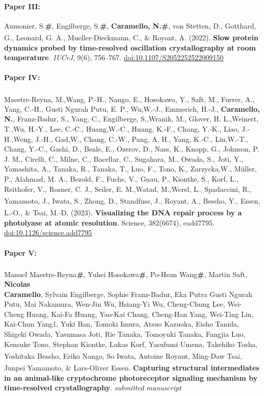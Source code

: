 \documentclass{report}
\begin{document}
\paragraph{Paper III:} Aumonier, S.\textbf{\#}, Engilberge, S.\textbf{\#},\textbf{ Caramello, N.}\textbf{\#}, von Stetten, D., Gotthard, G., Leonard, G. A., Mueller-Dieckmann, C., \& Royant, A.\textsuperscript{\textbf{\textalpha}} (2022). \textbf{Slow protein dynamics probed by time-resolved oscillation crystallography at room temperature}. \textit{IUCrJ}, 9(6), 756–767. \url{doi:10.1107/S2052252522009150}

\paragraph{Paper IV:} Maestre-Reyna\textsuperscript{\textbf{\textalpha}}, M.,Wang, P.-H., Nango, E., Hosokawa, Y., Saft, M., Furrer, A., Yang, C.-H., Gusti Ngurah Putu, E. P., Wu,W.-J., Emmerich, H.-J., \textbf{Caramello, N.}, Franz-Badur, S., Yang, C., Engilberge, S.,Wranik, M., Glover, H. L.,Weinert, T.,Wu, H.-Y., Lee, C.-C., Huang,W.-C., Huang, K.-F., Chang, Y.-K., Liao, J.-H.,Weng, J.-H., Gad,W., Chang, C.-W., Pang, A. H., Yang, K.-C., Lin,W.-T., Chang, Y.-C., Gashi, D., Beale, E., Ozerov, D., Nass, K., Knopp, G., Johnson, P. J. M., Cirelli, C., Milne, C., Bacellar, C., Sugahara, M., Owada, S., Joti, Y., Yamashita, A., Tanaka, R., Tanaka, T., Luo, F., Tono, K., Zarzycka,W., Müller, P., Alahmad, M. A., Bezold, F., Fuchs, V., Gnau, P., Kiontke, S., Korf, L., Reithofer, V., Rosner, C. J., Seiler, E. M.,Watad, M.,Werel, L., Spadaccini, R., Yamamoto, J., Iwata, S., Zhong, D., Standfuss, J., Royant, A., Bessho\textsuperscript{\textbf{\textalpha}}, Y., Essen, L.-O.\textsuperscript{\textbf{\textalpha}}, \& Tsai, M.-D.\textsuperscript{\textbf{\textalpha}} (2023). \textbf{Visualizing the DNA repair process by a photolyase at atomic resolution}. Science, 382(6674), eadd7795. \url{doi:10.1126/science.add7795}

\paragraph{Paper V:} Manuel Maestre-Reyna\textbf{\#}\textsuperscript{\textbf{\textalpha}}, Yuhei Hosokawa\textbf{\#}, Po-Hsun Wang\textbf{\#}, Martin Saft, \textbf{Nicolas\\ Caramello}, Sylvain Engilberge, Sophie Franz-Badur, Eka Putra Gusti Ngurah Putu, Mai Nakamura, Wen-Jin Wu, Hsiang-Yi Wu, Cheng-Chung Lee, Wei-Cheng Huang, Kai-Fa Huang, Yao-Kai Chang, Cheng-Han Yang, Wei-Ting Lin, Kai-Chun Yang1, Yuki Ban, Tomoki Imura, Atsuo Kazuoka, Eisho Tanida, Shigeki Owada, Yasumasa Joti, Rie Tanaka, Tomoyuki Tanaka, Fangjia Luo, Kensuke Tono, Stephan Kiontke, Lukas Korf, Yasufumi Umena, Takehiko Tosha, Yoshitaka Bessho, Eriko Nango,  So Iwata, Antoine Royant, Ming-Daw Tsai\textsuperscript{\textbf{\textalpha}}, Junpei Yamamoto\textsuperscript{\textbf{\textalpha}}, \& Lars-Oliver Essen\textsuperscript{\textbf{\textalpha}}. \textbf{Capturing structural intermediates in an animal-like cryptochrome photoreceptor signaling mechanism by time-resolved crystallography}. \textit{submitted manuscript}
\end{document}
